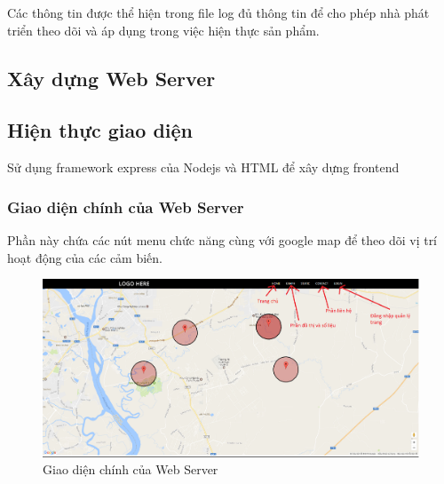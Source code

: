 Các thông tin được thể hiện trong file log đủ thông tin để cho phép nhà phát triển theo dõi và áp dụng trong việc hiện thực sản phẩm.
\subsection{Xây dựng Web Server}

\subsection{Hiện thực giao diện}

Sử dụng framework express của Nodejs và HTML để xây dựng frontend

\subsubsection*{Giao diện chính của Web Server}
Phần này chứa các nút menu chức năng cùng với google map để theo dõi vị trí hoạt động của các cảm biến.
\begin{center}
\begin{figure}[H]
\centering    
\includegraphics[width=1\textwidth]{webserver}
\caption[Giao diện chính của Web Server]{Giao diện chính của Web Server}
\label{fig:webserver}
\end{figure}
\end{center}

